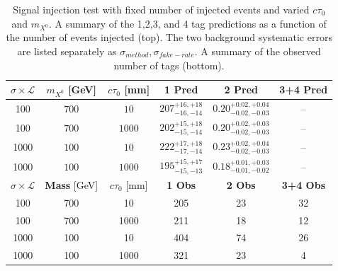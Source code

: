 \begin{table}
\caption{Signal injection test with fixed number of injected events and varied $c\tau_0$ and $m_{X^0}$. 
A summary of the 1,2,3, and 4 tag predictions as a function of the number of events injected (top). The two background systematic errors are
listed separately as $\sigma_{method},\sigma_{fake-rate}$.  A summary of the observed number of tags (bottom). 
\label{tab:700_100_injection_summary}}
\begin{center}
\begin{tabular}{cccccc}
\hline 
$\sigma\times\mathcal{L}$ & $m_{X^0}$ [GeV] & $c\tau_0$ [mm]  & \textbf{1 Pred} & \textbf{2 Pred} & \textbf{3+4 Pred} \\
\hline
100 &$ 700 $&$ 10 $&$ 207^{+16,+18}_{-16,-14} $&$0.20^{+0.02,+0.04}_{-0.02,-0.03} $&-- \\
100 &$ 700 $&$ 1000 $&$ 202^{+15,+18}_{-15,-14} $&$0.20^{+0.02,+0.03}_{-0.02,-0.03} $&--\\
1000 &$ 100 $&$ 10 $&$222^{+17,+18}_{-17,-14} $&$0.23^{+0.02,+0.04}_{-0.02,-0.03} $&--\\
1000 &$ 100 $&$ 1000 $&$ 195^{+15,+17}_{-15,-13} $&$0.18^{+0.01,+0.03}_{-0.01,-0.02} $&--\\ 
\hline 
\hline 
$\sigma\times\mathcal{L}$ & \textbf{Mass} [GeV] & $c\tau_0$ [mm]  & \textbf{1 Obs} & \textbf{2 Obs} & \textbf{3+4 Obs}  \\
\hline
100 & 700 & 10 & 205 & 23 & 32 \\
100 & 700 & 1000 & 211 & 18 & 12  \\
1000 & 100 & 10 & 404 & 74 & 26 \\
1000 & 100 & 1000 & 321 & 23 & 4  \\
\end{tabular} 
\end{center}
\end{table}


